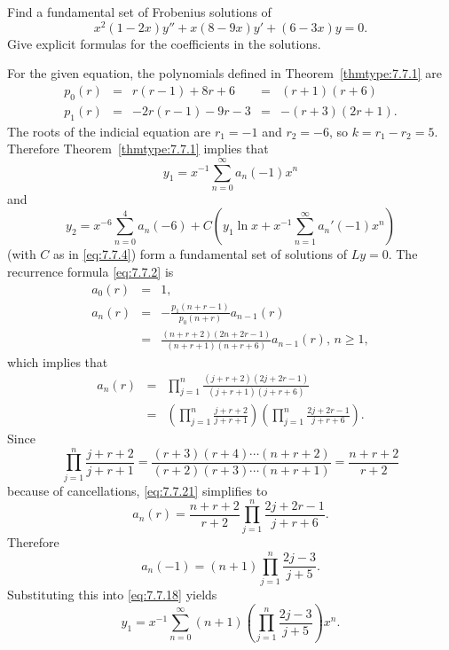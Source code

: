 \documentclass{ximera}
\begin{document}
\begin{example}\label{example:7.7.2}
Find a fundamental set of Frobenius  solutions of
$$
x^2(1-2x)y''+x(8-9x)y'+(6-3x)y=0.
$$
Give explicit  formulas for the coefficients in the solutions.

\begin{explanation}
For  the given equation, the polynomials defined in
Theorem~\ref{thmtype:7.7.1} are
$$
\begin{array}{ccccc}
p_0(r)&=&r(r-1)+8r+6&=&(r+1)(r+6)\\
p_1(r)&=&-2r(r-1)-9r-3&=&-(r+3)(2r+1).
\end{array}
$$
The roots of the indicial equation  are $r_1=-1$ and $r_2=-6$,
so $k=r_1-r_2=5$. Therefore Theorem~\ref{thmtype:7.7.1} implies that
\begin{equation} \label{eq:7.7.18}
y_1=x^{-1}\sum_{n=0}^\infty a_n(-1)x^n
\end{equation}
and
\begin{equation} \label{eq:7.7.19}
y_2=x^{-6}\sum_{n=0}^4a_n(-6)+C\left(y_1\ln
x+x^{-1}\sum_{n=1}^\infty a_n'(-1)x^n\right)
\end{equation}
(with $C$ as in \eqref{eq:7.7.4})
form a fundamental set of solutions of $Ly=0$. The
recurrence formula \eqref{eq:7.7.2} is
\begin{equation} \label{eq:7.7.20}
\begin{array}{ccl}
a_0(r)&=&1,\\
a_n(r)&=&-\frac{p_1(n+r-1)}{p_0(n+r)}a_{n-1}(r)\\
&=&\frac{(n+r+2)(2n+2r-1)}{(n+r+1)(n+r+6)}a_{n-1}(r),\,n\geq 1,
\end{array}
\end{equation}
which implies that
\begin{equation} \label{eq:7.7.21}
\begin{array}{ccl}
a_n(r)&=&\prod_{j=1}^n\frac{(j+r+2)(2j+2r-1)}{(j+r+1)(j+r+6)}\\
&=&\left(\prod_{j=1}^n\frac{j+r+2}{j+r+1}\right)
\left(\prod_{j=1}^n\frac{2j+2r-1}{j+r+6}\right).
\end{array}
\end{equation}
Since
$$
\prod_{j=1}^n\frac{j+r+2}{j+r+1}=\frac{(r+3)(r+4)\cdots(n+r+2)}{(r+2)(r+3)\cdots(n+r+1)}=\frac{n+r+2}{r+2}
$$
because of cancellations, \eqref{eq:7.7.21}  simplifies to
$$
a_n(r)=\frac{n+r+2}{r+2}\prod_{j=1}^n\frac{2j+2r-1}{j+r+6}.
$$
Therefore
$$
a_n(-1)=(n+1)\prod_{j=1}^n\frac{2j-3}{j+5}.
$$
Substituting this into \eqref{eq:7.7.18} yields
$$
y_1=x^{-1}\sum_{n=0}^\infty (n+1)\left(\prod_{j=1}^n\frac{2j-3}{j+5}\right) x^n.
$$


\end{explanation}
\end{example}
\end{document}
